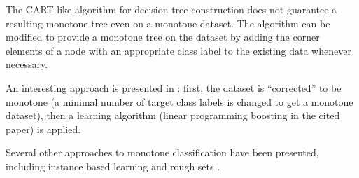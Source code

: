The CART-like algorithm for decision tree construction does not guarantee a resulting monotone tree even on a monotone dataset. The algorithm can be modified \citep{biblio:mon_trees} to provide a monotone tree on the dataset by adding the corner elements of a node with an appropriate class label to the existing data whenever necessary.

An interesting approach is presented in \citep{biblio:mon_transf}: first, the dataset is ``corrected'' to be monotone (a minimal number of target class labels is changed to get a monotone dataset), then a learning algorithm (linear programming boosting in the cited paper) is applied.

Several other approaches to monotone classification have been presented, including instance based learning \citep{biblio:ibl} and rough sets \citep{biblio:rough_sets}.








